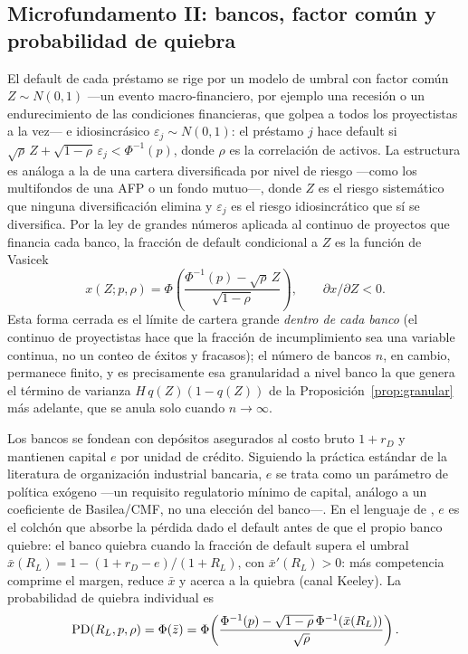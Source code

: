 \subsection{Microfundamento II: bancos, factor común y probabilidad de quiebra}\label{sec:bancos}
El default de cada préstamo se rige por un modelo de umbral con factor común $Z\sim N(0,1)$
—un evento macro-financiero, por ejemplo una recesión o un endurecimiento de las condiciones
financieras, que golpea a todos los proyectistas a la vez— e idiosincrásico
$\varepsilon_j\sim N(0,1)$: el préstamo $j$ hace default si
$\sqrt{\rho}\,Z+\sqrt{1-\rho}\,\varepsilon_j<\Phi^{-1}(p)$, donde $\rho$ es la correlación de
activos. La estructura es análoga a la de una cartera diversificada por nivel de riesgo —como
los multifondos de una AFP o un fondo mutuo—, donde $Z$ es el riesgo sistemático que ninguna
diversificación elimina y $\varepsilon_j$ es el riesgo idiosincrático que sí se diversifica. Por
la ley de grandes números aplicada al continuo de proyectos que financia cada banco, la fracción
de default condicional a $Z$ es la función de Vasicek \citep{Vasicek2002,Gordy2003}
\begin{equation}
x(Z;p,\rho)=\Phi\!\left(\frac{\Phi^{-1}(p)-\sqrt{\rho}\,Z}{\sqrt{1-\rho}}\right),\qquad \partial x/\partial Z<0.
\label{eq:vasicek}
\end{equation}
Esta forma cerrada es el límite de cartera grande \emph{dentro de cada banco} (el continuo de
proyectistas hace que la fracción de incumplimiento sea una variable continua, no un conteo de éxitos
y fracasos); el número de bancos $n$, en cambio, permanece finito, y es precisamente esa
granularidad a nivel banco la que genera el término de varianza $H\,q(Z)(1-q(Z))$ de la
Proposición~\ref{prop:granular} más adelante, que se anula solo cuando $n\to\infty$.

Los bancos se fondean con depósitos asegurados al costo bruto $1+r_D$ y mantienen capital $e$
por unidad de crédito. Siguiendo la práctica estándar de la literatura de organización
industrial bancaria, $e$ se trata como un parámetro de política exógeno —un requisito
regulatorio mínimo de capital, análogo a un coeficiente de Basilea/CMF, no una elección del
banco—. En el lenguaje de \citet{Merton1974}, $e$ es el colchón que absorbe la pérdida dado el
default antes de que el propio banco quiebre: el banco quiebra cuando la fracción de default
supera el umbral $\bar x(R_L)=1-(1+r_D-e)/(1+R_L)$, con $\bar x'(R_L)>0$: más competencia
comprime el margen, reduce $\bar x$ y acerca a la quiebra (canal Keeley). La probabilidad de
quiebra individual es
\begin{equation}
\mathrm{PD}(R_L,p,\rho)=\Phi(\bar z)=\Phi\!\left(\frac{\Phi^{-1}(p)-\sqrt{1-\rho}\,\Phi^{-1}(\bar x(R_L))}{\sqrt{\rho}}\right).
\label{eq:pd}
\end{equation}

